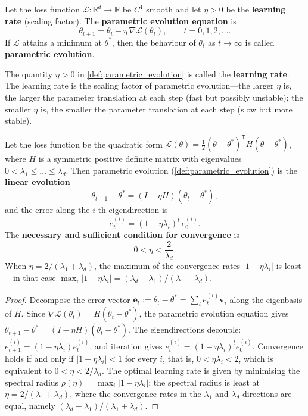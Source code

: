 \begin{definition}\label{def:parametric_evolution}
Let the loss function $\mathcal{L}:\mathbb{R}^d\to\mathbb{R}$ be $C^1$ smooth and let $\eta>0$ be the \textbf{learning rate} (scaling factor). The \textbf{parametric evolution equation} is
\[
\theta_{t+1} = \theta_t - \eta\,\nabla\mathcal{L}(\theta_t), \qquad t = 0,1,2,\dots.
\]
If $\mathcal{L}$ attains a minimum at $\theta^*$, then the behaviour of $\theta_t$ as $t\to\infty$ is called \textbf{parametric evolution}.
\end{definition}

\begin{definition}\label{def:learning_rate}
The quantity $\eta>0$ in \cref{def:parametric_evolution} is called the \textbf{learning rate}. The learning rate is the scaling factor of parametric evolution---the larger $\eta$ is, the larger the parameter translation at each step (fast but possibly unstable); the smaller $\eta$ is, the smaller the parameter translation at each step (slow but more stable).
\end{definition}

\begin{theorem}\label{thm:parametric_evolution_convergence}
Let the loss function be the quadratic form $\mathcal{L}(\theta) = \frac{1}{2}(\theta-\theta^*)^{\mathsf T}H(\theta-\theta^*)$, where $H$ is a symmetric positive definite matrix with eigenvalues $0 < \lambda_1\le\dots\le\lambda_d$. Then parametric evolution (\cref{def:parametric_evolution}) is the \textbf{linear evolution}
\[
\theta_{t+1} - \theta^* = (I - \eta H)(\theta_t - \theta^*),
\]
and the error along the $i$-th eigendirection is
\[
e_t^{(i)} = (1-\eta\lambda_i)^t\,e_0^{(i)}.
\]
The \textbf{necessary and sufficient condition for convergence} is
\[
0 < \eta < \frac{2}{\lambda_d}.
\]
When $\eta = 2/(\lambda_1+\lambda_d)$, the maximum of the convergence rates $|1-\eta\lambda_i|$ is least---in that case $\max_i|1-\eta\lambda_i| = (\lambda_d-\lambda_1)/(\lambda_1+\lambda_d)$.
\end{theorem}

\begin{proof}
Decompose the error vector $\mathbf{e}_t := \theta_t - \theta^* = \sum_i e_t^{(i)}\mathbf{v}_i$ along the eigenbasis of $H$. Since $\nabla\mathcal{L}(\theta_t) = H(\theta_t-\theta^*)$, the parametric evolution equation gives $\theta_{t+1}-\theta^* = (I-\eta H)(\theta_t-\theta^*)$. The eigendirections decouple: $e_{t+1}^{(i)} = (1-\eta\lambda_i)e_t^{(i)}$, and iteration gives $e_t^{(i)} = (1-\eta\lambda_i)^t e_0^{(i)}$. Convergence holds if and only if $|1-\eta\lambda_i|<1$ for every $i$, that is, $0<\eta\lambda_i<2$, which is equivalent to $0<\eta<2/\lambda_d$. The optimal learning rate is given by minimising the spectral radius $\rho(\eta) = \max_i|1-\eta\lambda_i|$; the spectral radius is least at $\eta = 2/(\lambda_1+\lambda_d)$, where the convergence rates in the $\lambda_1$ and $\lambda_d$ directions are equal, namely $(\lambda_d-\lambda_1)/(\lambda_1+\lambda_d)$.
\end{proof}

